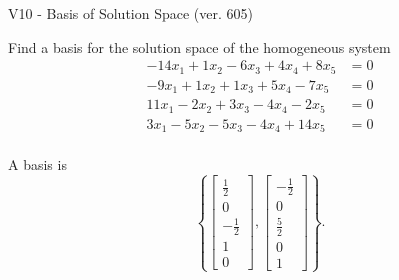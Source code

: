 \begin{exercise}
  \begin{exerciseTitle}V10 - Basis of Solution Space (ver. 605)\end{exerciseTitle}
  \begin{exerciseStatement}
    Find a basis for the solution space of the homogeneous system 
\begin{align*}
 -14 x_ 1 + 1 x_ 2 -6 x_ 3 + 4 x_ 4 + 8 x_ 5 &= 0  \\ 
  -9 x_ 1 + 1 x_ 2 + 1 x_ 3 + 5 x_ 4 -7 x_ 5 &= 0  \\ 
  11 x_ 1 -2 x_ 2 + 3 x_ 3 -4 x_ 4 -2 x_ 5 &= 0  \\ 
  3 x_ 1 -5 x_ 2 -5 x_ 3 -4 x_ 4 + 14 x_ 5 &= 0  \\ 
 \end{align*}


 
  \end{exerciseStatement}

  \begin{exerciseAnswer}
   A basis is   
\[\left\{\left[\begin{array}{c}
\frac{1}{2} \\
0 \\
-\frac{1}{2} \\
1 \\
0
\end{array}\right] , \left[\begin{array}{c}
-\frac{1}{2} \\
0 \\
\frac{5}{2} \\
0 \\
1
\end{array}\right]\right\}.\]

  


  \end{exerciseAnswer}
\end{exercise}